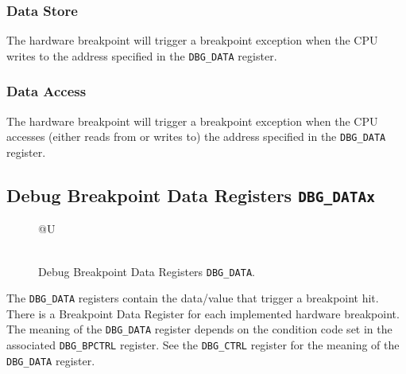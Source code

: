 \subsubsection{Data Store}\label{data-store}

The hardware breakpoint will trigger a breakpoint exception when the CPU
writes to the address specified in the \texttt{DBG\_DATA} register.

\subsubsection{Data Access}\label{data-access}

The hardware breakpoint will trigger a breakpoint exception when the CPU
accesses (either reads from or writes to) the address specified in the
\texttt{DBG\_DATA} register.

\subsection{Debug Breakpoint Data Registers
\texttt{DBG\_DATAx}}\label{debug-breakpoint-data-registers-dbg_datax}

\ifdefined\MARKDOWN
\else

\begin{figure*}[h!]
	{\footnotesize
		\begin{center}
			\begin{tabular}{@{}U}
				 \\
				\hline
				  \\
				\hline
			\end{tabular}
		\end{center}
	}
	\vspace{-0.1in}
	\caption{Debug Breakpoint Data Registers \texttt{DBG\_DATA}.}
	\label{fig:dbgdatareg}
\end{figure*}

\fi

The \texttt{DBG\_DATA} registers contain the data/value that trigger a breakpoint
hit. There is a Breakpoint Data Register for each implemented hardware
breakpoint. The meaning of the \texttt{DBG\_DATA} register depends on the
condition code set in the associated \texttt{DBG\_BPCTRL} register. See the
\texttt{DBG\_CTRL} register for the meaning of the \texttt{DBG\_DATA} register.